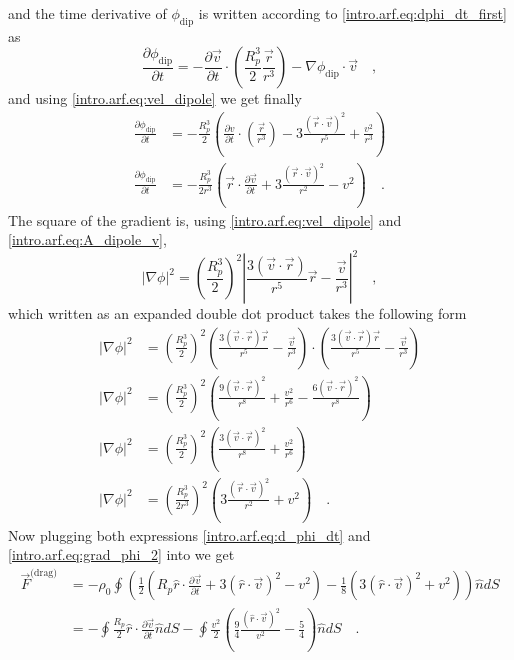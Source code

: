 and the time derivative of $\phi_{\text{dip}}$ is written according to \eqref{intro.arf.eq:dphi_dt_first} as
\begin{equation}
    \frac{\partial\phi_{\text{dip}}}{\partial t} = -\frac{\partial\vec v}{\partial t}\cdot\left(\frac{R_p^3}{2}\frac{\vec r}{r^3}\right) - \nabla\phi_{\text{dip}}\cdot\vec v\quad,
\end{equation}
and using \eqref{intro.arf.eq:vel_dipole} we get finally
\begin{align}\label{intro.arf.eq:d_phi_dt}
    \frac{\partial\phi_{\text{dip}}}{\partial t} &= -\frac{R_p^3}{2}\left(\frac{\partial v}{\partial t}\cdot\left(\frac{\vec r}{r^3}\right) - 3\frac{(\vec r\cdot\vec v)^2}{r^5} + \frac{v^2}{r^3}\right)\nonumber\\
    \frac{\partial\phi_{\text{dip}}}{\partial t} &= -\frac{R_p^3}{2r^3}\left(\vec r\cdot\frac{\partial\vec v}{\partial t} + 3\frac{(\vec r\cdot\vec v)^2}{r^2}-v^2\right)\quad.
\end{align}
The square of the gradient is, using \eqref{intro.arf.eq:vel_dipole} and \eqref{intro.arf.eq:A_dipole_v},
\begin{equation}
    |\nabla\phi|^2 = \left(\frac{R_p^3}{2}\right)^2\left|\frac{3(\vec v\cdot\vec r)}{r^5}\vec r - \frac{\vec v}{r^3}\right|^2\quad,
\end{equation}
which written as an expanded double dot product takes the following form
\begin{align}
    |\nabla\phi|^2 &= \left(\frac{R_p^3}{2}\right)^2\left(\frac{3(\vec v\cdot\vec r)\vec r}{r^5} - \frac{\vec v}{r^3}\right)\cdot\left(\frac{3(\vec v\cdot\vec r)\vec r}{r^5} - \frac{\vec v}{r^3}\right)\nonumber\\
    |\nabla\phi|^2 &= \left(\frac{R_p^3}{2}\right)^2\left(\frac{9(\vec v\cdot\vec r)^2}{r^{8}} + \frac{v^2}{r^6} - \frac{6(\vec v\cdot\vec r)^2}{r^{8}}\right)\nonumber\\
    |\nabla\phi|^2 &= \left(\frac{R_p^3}{2}\right)^2\left(\frac{3(\vec v\cdot\vec r)^2}{r^{8}} + \frac{v^2}{r^6}\right)\nonumber\\
    |\nabla\phi|^2 &= \left(\frac{R_p^3}{2r^3}\right)^2\left(3\frac{(\vec r\cdot\vec v)^2}{r^2} + v^2\right)\quad.\label{intro.arf.eq:grad_phi_2}
\end{align}
Now plugging both expressions \eqref{intro.arf.eq:d_phi_dt} and \eqref{intro.arf.eq:grad_phi_2} into \label{drag_F} we get
\begin{align}
    \vec F^{\text{(drag)}} &= - \rho_0\oint \left(\frac{1}{2}\left(R_p\hat r\cdot\frac{\partial\vec v}{\partial t} + 3(\hat r\cdot\vec v)^2 - v^2\right) -\frac{1}{8}\left(3(\hat r\cdot\vec v)^2 + v^2\right)\right)\hat n dS\nonumber\\
    &= - \oint \frac{R_p}{2}\hat r\cdot\frac{\partial\vec v}{\partial t}\hat n dS - \oint \frac{v^2}{2}\left(\frac{9}{4}\frac{(\hat r\cdot\vec v)^2}{v^2} - \frac{5}{4}\right)\hat n dS\quad.
\end{align}
